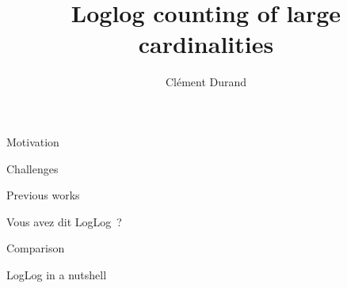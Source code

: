 \documentclass[aspectratio=169]{beamer}
\title[]
      {Loglog counting of large cardinalities}
\author{%
  Cl\'ement Durand%
}
\begin{document}
\maketitle


  \begin{frame}{Motivation}
  \end{frame}

  \begin{frame}{Challenges}
  \end{frame}

  \begin{frame}{Previous works}
  \end{frame}


  \begin{frame}{Vous avez dit LogLog~?}
  \end{frame}

  \begin{frame}{Comparison}
  \end{frame}


  \begin{frame}{LogLog in a nutshell}
  \end{frame}
\end{document}
